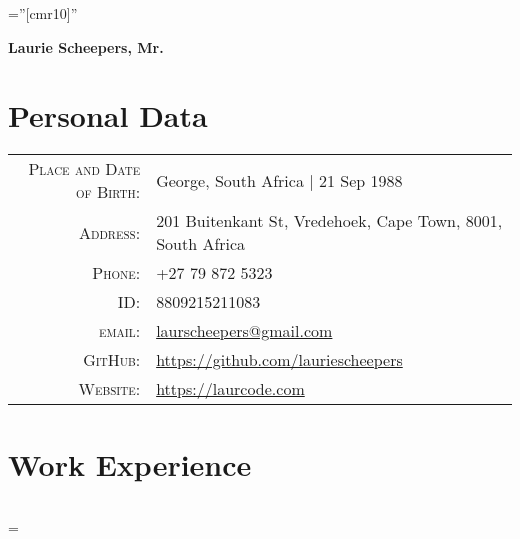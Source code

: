 \documentclass[a4paper,10pt,notitlepage]{article}
\newenvironment{absolutelynopagebreak}
  {\par\nobreak\vfil\penalty0\vfilneg
   \vtop\bgroup}
  {\par\xdef\tpd{\the\prevdepth}\egroup
   \prevdepth=\tpd}
\begin{document}
\pagestyle{empty} %

\font\fb=''[cmr10]'' %


\addtolength{\voffset}{-0.8cm} %

\begin{absolutelynopagebreak}
	
	\begin{center}
		\begin{center}
			\Huge\textbf{Laurie Scheepers, Mr.}
		\end{center}
	\end{center}
		
	\section{Personal Data}
	
	\begin{tabular}{rl}
		\textsc{Place and Date of Birth:} & George, South Africa  | 21 Sep 1988                                 \\
		\textsc{Address:}                 & 201 Buitenkant St, Vredehoek, Cape Town, 8001, South Africa \\
		\textsc{Phone:}                   & +27 79 872 5323                                                     \\
		\textsc{ID:}                      & 8809215211083                                                       \\
		\textsc{email:}                   & \href{mailto:laurscheepers@gmail.com}{laurscheepers@gmail.com}      \\
		\textsc{GitHub:}                  & \href{https://github.com/lauriescheepers}{https://github.com/lauriescheepers} \\
		\textsc{Website:}                 & \href{https://laurcode.com}{https://laurcode.com}
	\end{tabular}
	
	
	\section{Work Experience}
	\begin{tabular}{r|p{11cm}}
	

\end{tabular}
\end{absolutelynopagebreak}
\end{document}

